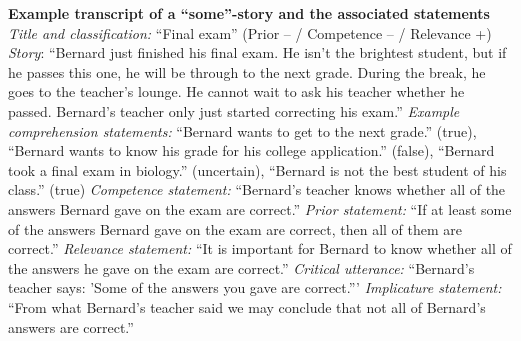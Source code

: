 \documentclass{sp}
\newcommand{\mf}[1]{\textcolor{BurntOrange}{[MF: #1]}}
\begin{document}
\begin{exe}
\ex \textbf{Example transcript of a “some”-story and the associated statements}\newline
\textit{Title and classification:} ``Final exam'' (Prior -- / Competence -- / Relevance +)\newline
\textit{Story}: ``Bernard just finished his final exam. He isn't the brightest student, but if he passes this one, he will be through to the next grade. During the break, he goes to the teacher's lounge. He cannot wait to ask his teacher whether he passed. Bernard's teacher only just started correcting his exam.''\newline
\textit{Example comprehension statements:} ``Bernard wants to get to the next grade.'' (true), ``Bernard wants to know his grade for his college application.'' (false), ``Bernard took a final exam in biology.'' (uncertain), ``Bernard is not the best student of his class.'' (true)\newline
\textit{Competence statement:} ``Bernard’s teacher knows whether all of the answers Bernard gave on the exam are correct.''\newline
\textit{Prior statement:} ``If at least some of the answers Bernard gave on the exam are correct, then all of them are correct.''\newline
\textit{Relevance statement:} ``It is important for Bernard to know whether all of the answers he gave on the exam are correct.''\newline
\textit{Critical utterance:} ``Bernard’s teacher says: 'Some of the answers you gave are correct.'''\newline
\textit{Implicature statement:} ``From what Bernard’s teacher said we may conclude that not all of Bernard’s answers are correct.''\newline
\end{exe}

\end{document}
